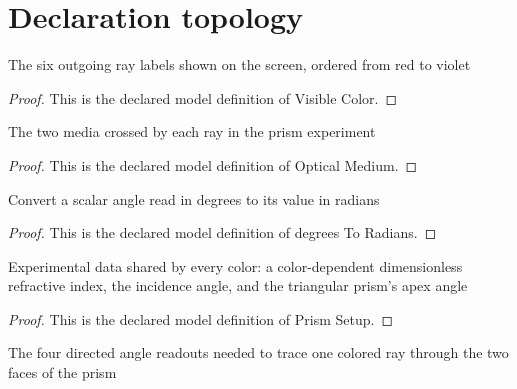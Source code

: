 \section{Declaration topology}
\begin{definition}
  \label{def:physics:phyx-mini-0008:phyxminiproblems-problem0008-visiblecolor}
  The six outgoing ray labels shown on the screen, ordered from red to violet
\end{definition}
\begin{proof}
  This is the declared model definition of Visible Color.
\end{proof}
\begin{definition}
  \label{def:physics:phyx-mini-0008:phyxminiproblems-problem0008-opticalmedium}
  The two media crossed by each ray in the prism experiment
\end{definition}
\begin{proof}
  This is the declared model definition of Optical Medium.
\end{proof}
\begin{definition}
  \label{def:physics:phyx-mini-0008:phyxminiproblems-problem0008-degreestoradians}
  Convert a scalar angle read in degrees to its value in radians
\end{definition}
\begin{proof}
  This is the declared model definition of degrees To Radians.
\end{proof}
\begin{definition}
  \label{def:physics:phyx-mini-0008:phyxminiproblems-problem0008-prismsetup}
  Experimental data shared by every color: a color-dependent dimensionless refractive index, the incidence angle, and the triangular prism's apex angle
\end{definition}
\begin{proof}
  This is the declared model definition of Prism Setup.
\end{proof}
\begin{definition}
  \label{def:physics:phyx-mini-0008:phyxminiproblems-problem0008-prismrayangles}
  The four directed angle readouts needed to trace one colored ray through the two faces of the prism
\end{definition}
